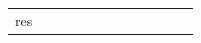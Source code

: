 \documentclass[conference]{IEEEtran}
\begin{document}
\begin{figure}
\begin{center}
\begin{tabular}{| x{1.11cm} | x{.75cm} | x{.75cm} || x{1.11cm} | x{.75cm} | x{.75cm} || x{1.11cm} | x{.75cm} | x{.75cm} || x{1.11cm} | x{.75cm} | x{.75cm} |}
res
\end{tabular}
\end{center}
\end{figure}
\end{document}
